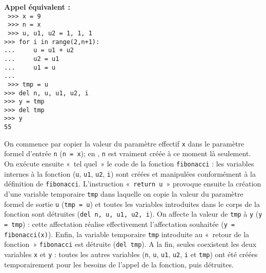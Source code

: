 \noindent\mbox{}\hspace*{1cm}\begin{py}{4.75cm}
{\bf Appel équivalent :}\\\tt
>>> x = 9\\
{\color{red} >>> n = x}\\
{\color{blue}
>>> u, u1, u2 = 1, 1, 1\\
>>> for i in range(2,n+1):\\
... \ \ \ \ u = u1 + u2\\
... \ \ \ \ u2 = u1\\
... \ \ \ \ u1 = u\\
...}\\
{\color{red} >>> tmp = u\\
>>> del n, u, u1, u2, i\\
>>> y = tmp\\
>>> del tmp}\\
>>> y\\
55
\end{py}
\hfill
\begin{py}{10cm}
\noindent On commence par copier la valeur du paramètre effectif {\tt x}
dans le paramètre formel d'entrée {\tt n} ({\color{red}\tt n = x});
en \python, {\tt n} est vraiment créée à ce moment là seulement.
On exécute ensuite «~tel quel~» le code de la fonction {\tt fibonacci} :
les variables internes à la fonction ({\tt u}, {\tt u1}, {\tt u2}, {\tt i})
sont créées et manipulées conformément à la définition de {\tt fibonacci}.
L'instruction «~{\tt return u}~» provoque ensuite la création d'une variable 
temporaire {\tt tmp} dans laquelle on copie la valeur du paramètre formel 
de sortie {\tt u} ({\color{red}\tt tmp = u}) et toutes les variables introduites
dans le corps de la fonction sont détruites
({\color{red}\tt del n, u, u1, u2, i}). On affecte la valeur de {\tt tmp} à {\tt y} ({\color{red}\tt y = tmp}) :
cette affectation réalise effectivement l'affectation souhaitée ({\tt y = fibonacci(x)}). 
Enfin, la variable temporaire {\tt tmp} introduite
au «~retour de la fonction~» {\tt fibonacci} est détruite ({\color{red}\tt del tmp}).
A la fin, seules coexistent les deux variables {\tt x} et {\tt y} : toutes les autres
variables ({\tt n}, {\tt u}, {\tt u1}, {\tt u2}, {\tt i} et {\tt tmp}) ont été
créées temporairement pour les besoins de l'appel de la fonction, puis détruites.
\end{py}
\hspace*{1cm}\mbox{}\vspace*{2mm}


